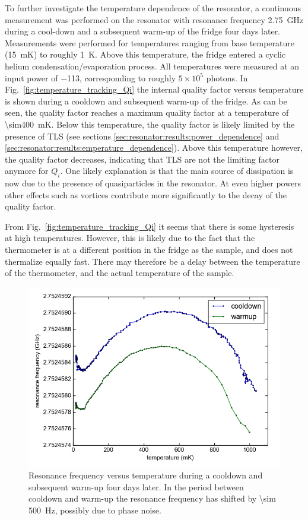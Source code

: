 To further investigate the temperature dependence of the resonator, a continuous measurement was performed on the resonator with resonance frequency \SI{2.75}{\giga \hertz} during a cool-down and a subsequent warm-up of the fridge four days later. Measurements were performed for temperatures ranging from base temperature (\SI{15}{\milli \kelvin}) to roughly \SI{1}{\kelvin}. Above this temperature, the fridge entered a cyclic helium condensation/evaporation process. All temperatures were measured at an input power of \SI{-113}{\dBm}, corresponding to roughly $5 \times 10^5$ photons. In Fig.~\ref{fig:temperature_tracking_Qi} the internal quality factor versus temperature is shown during a cooldown and subsequent warm-up of the fridge. As can be seen, the quality factor reaches a maximum quality factor at a temperature of \SI{\sim400}{\milli \kelvin}. Below this temperature, the quality factor is likely limited by the presence of TLS (see sections \ref{sec:resonator:results:power_dependence} and \ref{sec:resonator:results:emperature_dependence}). Above this temperature however, the quality factor decreases, indicating that TLS are not the limiting factor anymore for $Q_i$. One likely explanation is that the main source of dissipation is now due to the presence of quasiparticles in the resonator. At even higher powers other effects such as vortices contribute more significantly to the decay of the quality factor.

From Fig.~\ref{fig:temperature_tracking_Qi} it seems that there is some hysteresis at high temperatures. However, this is likely due to the fact that the thermometer is at a different position in the fridge as the sample, and does not thermalize equally fast. There may therefore be a delay between the temperature of the thermometer, and the actual temperature of the sample.

\begin{figure}[h!]
    \centering
    \includegraphics[width=.72\textwidth]{Figures/DRIE/Temperature tracking - f0 vs T.png}
    \caption{Resonance frequency versus temperature during a cooldown and subsequent warm-up four days later. In the period between cooldown and warm-up the resonance frequency has shifted by \SI{\sim 500}{\hertz}, possibly due to phase noise.}
    \label{fig:temperature_tracking_f0}
\end{figure}


